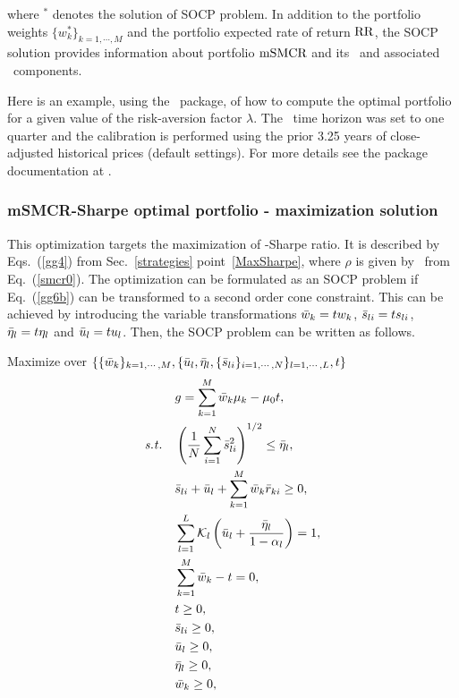 \noindent where $^*$ denotes the solution of SOCP problem.
In addition to the portfolio weights $\{w_k^*\}_{k=1,\cdots,M}$ and the portfolio expected rate of return ${\rm RR}$,
the SOCP solution provides information about portfolio ${\rm mSMCR}$ and its \SMCR\  and
associated \SMVaR\ components.

\bigskip
\noindent Here is an example, using the \azapy\ package, of how to compute the optimal portfolio
for a given value of the risk-aversion factor $\lambda$.
The \mSMCR\ time horizon was set to one quarter and the calibration is performed using the prior 3.25 years of
close-adjusted historical prices (default settings).
For more details see the package documentation at \azapydoc.



\BackToContents

\subsubsection{mSMCR-Sharpe optimal portfolio - maximization solution}
This optimization targets the maximization of \mSMCR-Sharpe ratio.
It is described by Eqs.~(\ref{gg4}) from Sec.~\ref{strategies} point~\ref{MaxSharpe},
where $\rho$ is given by \mSMCR\ from Eq.~(\ref{smcr0}).
The optimization can be formulated as an SOCP problem
if Eq.~(\ref{gg6b}) can be transformed to a second order cone constraint. This can be achieved by introducing the
variable transformations ${\bar w}_k = t w_k$, ${\bar s}_{li} = t s_{li}$, ${\bar \eta}_l = t \eta_l$  and ${\bar u}_l = t u_l$.
Then, the SOCP problem can be written as follows.

\bigskip
\noindent Maximize over $\{ \{{\bar w}_k\}_{k=1,\cdots,M}, \{ {\bar u}_l, {\bar \eta}_l, \{{\bar s}_{li}\}_{i=1,\cdots,N} \}_{l=1,\cdots,L}, t\}$
\begin{subequations}\label{smcr9}
\begin{align}
    &g = \sum_{k=1}^M \bw_k \mu_k - \mu_0 t, \label{smcr9a} \\
    \st &\left( \frac{1}{N} \sum_{i=1}^N \bs_{li}^2 \right)^{1/2} \leq \bbeta_l, \label{smcr9b} \\
        &\bs_{li} + \bu_l + \sum_{k=1}^M \bw_k \br_{ki} \geq 0, \label{smcr9c} \\
        &\sum_{l=1}^L \cK_l \left( \bu_l + \frac{\bbeta_l}{1 - \alpha_l}  \right) = 1, \label{smcr9d} \\
        &\sum_{k=1}^M \bw_k - t = 0, \label{smcr9e} \\
        &t \geq 0, \label{smcr9i} \\
        &\bs_{li} \geq 0, \label{smcr9f} \\
        &\bu_l \geq 0, \label{smcr9j} \\
        &\bbeta_l \geq 0, \label{smcr9h} \\
        &\bw_k \geq 0, \label{smcr9g}
\end{align}
\end{subequations}


